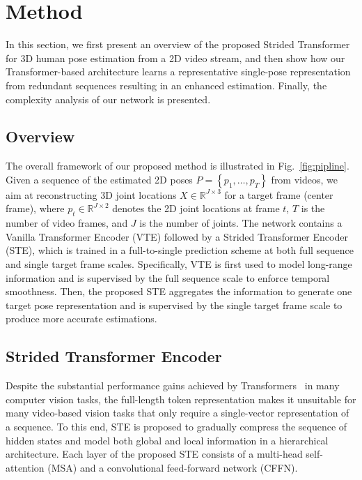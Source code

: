 \documentclass[journal]{IEEEtran}
\begin{document}
\section{Method}
In this section, we first present an overview of the proposed Strided Transformer for 3D human pose estimation from a 2D video stream, and then show how our Transformer-based architecture learns a representative single-pose representation from redundant sequences resulting in an enhanced estimation. 
Finally, the complexity analysis of our network is presented. 

\subsection{Overview}
The overall framework of our proposed method is illustrated in Fig.~\ref{fig:pipline}. 
Given a sequence of the estimated 2D poses
$P=\left\{p_{1}, \ldots, p_{T}\right\}$ from videos, we aim at reconstructing 3D joint locations $X \in \mathbb{R}^{J \times 3}$ for a target frame (center frame), where $p_{t} \in \mathbb{R}^{J \times 2}$ denotes the 2D joint locations at frame $t$, $T$ is the number of video frames, and $J$ is the number of joints. 
The network contains a Vanilla Transformer Encoder (VTE) followed by a Strided Transformer Encoder (STE), which is trained in a full-to-single prediction scheme at both full sequence and single target frame scales. 
Specifically, VTE is first used to model long-range information and is supervised by the full sequence scale to enforce temporal smoothness. 
Then, the proposed STE aggregates the information to generate one target pose representation and is supervised by the single target frame scale to produce more accurate estimations.  

\subsection{Strided Transformer Encoder}
\label{sec:STE}
Despite the substantial performance gains achieved by Transformers~\cite{Attention} in many computer vision tasks, the full-length token representation makes it unsuitable for many video-based vision tasks that only require a single-vector representation of a sequence. 
To this end, STE is proposed to gradually compress the sequence of hidden states and model both global and local information in a hierarchical architecture. 
Each layer of the proposed STE consists of a multi-head self-attention (MSA) and a convolutional feed-forward network (CFFN). 
\end{document}
